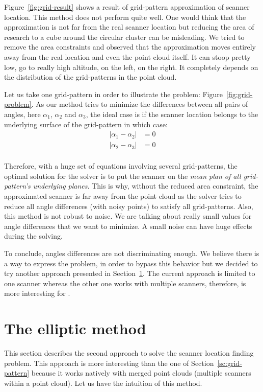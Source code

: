 Figure~\ref{fig:grid-result} shows a result of grid-pattern approximation of scanner location. This method does not perform quite well. One would think that the approximation is not far from the real scanner location but reducing the area of research to a cube around the circular cluster can be misleading. We tried to remove the area constraints and observed that the approximation moves entirely away from the real location and even the point cloud itself. It can stoop pretty low, go to really
high altitude, on the left, on the right. It completely depends on the distribution of the grid-patterns in the point cloud.

Let us take one grid-pattern in order to illustrate the problem: Figure~\ref{fig:grid-problem}. As our method tries to minimize the differences between all pairs of angles, here $\alpha_1$, $\alpha_2$ and $\alpha_3$, the ideal case is if the scanner location belongs to the underlying surface of the grid-pattern in which case:
\begin{align*}
  |\alpha_1 - \alpha_2| &= 0\\
  |\alpha_2 - \alpha_3| &= 0\\
\end{align*}

Therefore, with a huge set of equations involving several grid-patterns, the optimal solution for
the solver is to put the scanner on the \emph{mean plan of all grid-pattern's underlying planes}. This is why, without the reduced area constraint, the approximated scanner is far away from the point cloud as the solver tries to reduce all angle differences (with noisy points) to satisfy all grid-patterns. Also, this method is not robust to noise. We are talking about really small values for angle differences that we want to minimize. A small noise can have
huge effects during the solving.

To conclude, angles differences are not discriminating enough. We believe there is a way to express the problem, in order to bypass this behavior but we decided to try another approach presented in Section~\ref{sc:elliptic}. The current approach is limited to one scanner whereas the other one works with multiple scanners, therefore, is more interesting for \CC.


\section{The elliptic method}
\label{sc:elliptic}
This section describes the second approach to solve the scanner location finding problem. This approach is more interesting than the one of Section~\ref{sc:grid-pattern} because it works natively with merged point clouds (multiple scanners within a point cloud). Let us have the intuition of this method.

